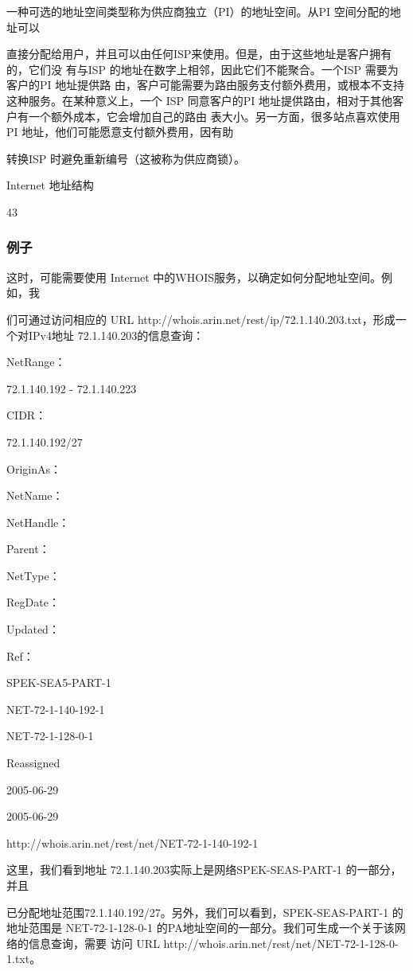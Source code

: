 一种可选的地址空间类型称为供应商独立（PI）的地址空间。从PI 空间分配的地址可以

直接分配给用户，并且可以由任何ISP来使用。但是，由于这些地址是客户拥有的，它们没
有与ISP 的地址在数字上相邻，因此它们不能聚合。一个ISP 需要为客户的PI 地址提供路
由，客户可能需要为路由服务支付额外费用，或根本不支持这种服务。在某种意义上，一个
ISP 同意客户的PI 地址提供路由，相对于其他客户有一个额外成本，它会增加自己的路由
表大小。另一方面，很多站点喜欢使用PI 地址，他们可能愿意支付额外费用，因有助

转换ISP 时避免重新编号（这被称为供应商锁）。

Internet 地址结构

43

\subsubsection{例子}
这时，可能需要使用 Internet 中的WHOIS服务，以确定如何分配地址空间。例如，我

们可通过访问相应的 URL http://whois.arin.net/rest/ip/72.1.140.203.txt，形成一个对IPv4地址
72.1.140.203的信息查询：

NetRange：

72.1.140.192 - 72.1.140.223

CIDR：

72.1.140.192/27

OriginAs：

NetName：

NetHandle：

Parent：

NetType：

RegDate：

Updated：

Ref：

SPEK-SEA5-PART-1

NET-72-1-140-192-1

NET-72-1-128-0-1

Reassigned

2005-06-29

2005-06-29

http://whois.arin.net/rest/net/NET-72-1-140-192-1

这里，我们看到地址 72.1.140.203实际上是网络SPEK-SEAS-PART-1 的一部分，并且

已分配地址范围72.1.140.192/27。另外，我们可以看到，SPEK-SEAS-PART-1 的地址范围是
NET-72-1-128-0-1 的PA地址空间的一部分。我们可生成一个关于该网络的信息查询，需要
访问 URL http://whois.arin.net/rest/net/NET-72-1-128-0-1.txt。

